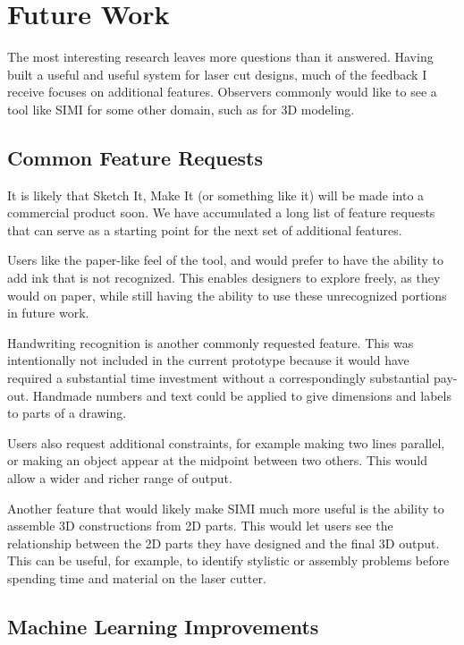 \section{Future Work}

The most interesting research leaves more questions than it
answered. Having built a useful and useful system for laser cut
designs, much of the feedback I receive focuses on additional
features. Observers commonly would like to see a tool like SIMI for
some other domain, such as for 3D modeling.

\subsection{Common Feature Requests}

It is likely that Sketch It, Make It (or something like it) will be
made into a commercial product soon. We have accumulated a long list
of feature requests that can serve as a starting point for the next
set of additional features.

Users like the paper-like feel of the tool, and would prefer to have
the ability to add ink that is not recognized. This enables designers
to explore freely, as they would on paper, while still having the
ability to use these unrecognized portions in future work.

Handwriting recognition is another commonly requested feature. This
was intentionally not included in the current prototype because it
would have required a substantial time investment without a
correspondingly substantial pay-out. Handmade numbers and text could
be applied to give dimensions and labels to parts of a drawing.

Users also request additional constraints, for example making two
lines parallel, or making an object appear at the midpoint between two
others. This would allow a wider and richer range of output.

Another feature that would likely make SIMI much more useful is the
ability to assemble 3D constructions from 2D parts. This would let
users see the relationship between the 2D parts they have designed and
the final 3D output. This can be useful, for example, to identify
stylistic or assembly problems before spending time and material on
the laser cutter.

\subsection{Machine Learning Improvements}

